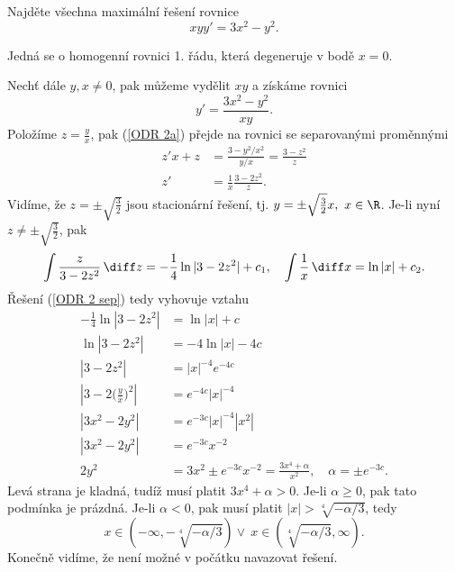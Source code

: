 \documentclass[answers]{exam}
\begin{document}
\begin{questions}
  \question
  Najd\v ete v\v sechna maxim\'aln\'i \v re\v sen\'i rovnice
  \begin{equation*}
  xyy'=3x^2-y^2.
  \end{equation*}
	
	\begin{solution}
		Jedn\'a se o homogenn\'i rovnici 1. \v r\'adu, kter\'a degeneruje v bod\v e $x=0$.
		
		Nechť d\'ale $y,x\ne0$, pak m\r u\v zeme vyd\v elit $xy$ a z\'isk\'ame rovnici
		\begin{equation}\label{ODR 2a}
		y'=\frac{3x^2-y^2}{xy}. 
		\end{equation}
		Polo\v z\'ime $z=\frac{y}{x}$, pak (\ref{ODR 2a}) p\v rejde na rovnici se separovan\'ymi prom\v enn\'ymi
		\begin{align}\label{ODR 2 sep}
		z'x+z&=\frac{3-y^2/x^2}{y/x}=\frac{3-z^2}{z}\nonumber\\
		z'&=\frac{1}{x}\frac{3-2z^2}{z}.
		\end{align}
		Vid\'ime, \v ze $z=\pm\sqrt{\frac{3}{2}}$ jsou stacion\'arn\'i \v re\v sen\'i, tj. $y=\pm\sqrt{\frac{3}{2}}x,\ x\in\R$. Je-li nyn\'i $z\ne\pm\sqrt{\frac{3}{2}}$, pak
		\begin{align*}
		\int\frac{z}{3-2z^2}\,\diff z=-\frac{1}{4}\ln|3-2z^2|+c_1,\quad \int\frac{1}{x}\,\diff x=\ln|x|+c_2. 
		\end{align*}
		\v Re\v sen\'i (\ref{ODR 2 sep}) tedy vyhovuje vztahu
		\begin{align*}
		-\frac{1}{4}\ln|3-2z^2|&=\ln|x|+c\\ 
		\ln|3-2z^2|&=-4\ln|x|-4c\\ 
		|3-2z^2|&=|x|^{-4}e^{-4c}\\ 
		|3-2(\frac{y}{x}\big)^2|&=e^{-4c}|x|^{-4}\\
		|3x^2-2y^2|&=e^{-3c}|x|^{-4}|x^2|\\
		|3x^2-2y^2|&=e^{-3c}x^{-2}\\
		2y^2&=3x^2\pm e^{-3c}x^{-2}=\frac{3x^4+\alpha}{x^2},\quad \alpha=\pm e^{-3c}.
		\end{align*}
		Lev\'a strana je kladná, tud\'i\v z mus\'i platit $3x^4+\alpha>0$. Je-li $\alpha\ge0$, pak tato podm\'inka je pr\'azdn\'a. Je-li $\alpha<0$, pak mus\'i platit $|x|>\sqrt[4]{-\alpha/3}$, tedy
		$$x\in(-\infty,-\sqrt[4]{-\alpha/3})\vee\ x\in(\sqrt[4]{-\alpha/3},\infty).$$
		Kone\v cn\v e vid\'ime, \v ze nen\'i mo\v zn\'e v po\v c\'atku navazovat \v re\v sen\'i.
			

\end{solution}
\end{questions}
\end{document}
